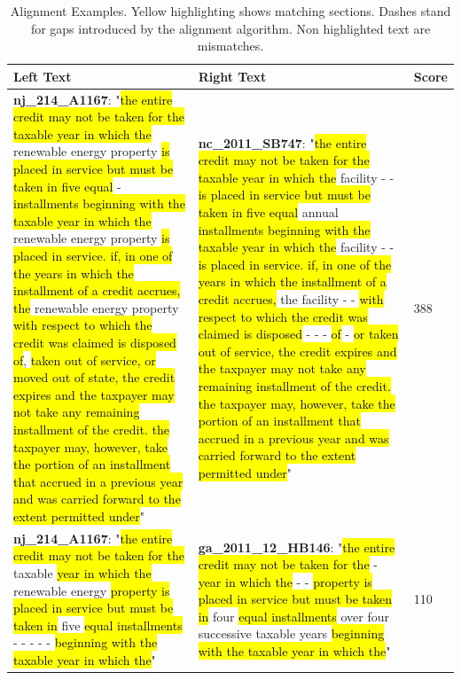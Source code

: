 \documentclass[12pt]{article} %
\begin{document}
\clearpage

\begin{table}[ht!]
\centering
\caption{Alignment Examples. Yellow highlighting shows matching sections. Dashes stand for gaps introduced by the alignment algorithm. Non highlighted text are mismatches.}
\label{tab:alignment_examples}
\bgroup
\def\arraystretch{2}
\begin{tabular}{p{}|p{}|p{}}
Left Text & Right Text & Score\\
\hline

\textbf{nj\_214\_A1167}: "\hl{the entire credit may not be taken for the taxable year in which the} renewable energy property \hl{is placed in service but must be taken in five equal} - \hl{installments beginning with the taxable year in which the} renewable energy property \hl{is placed in service. if, in one of the years in which the installment of a credit accrues, the} renewable energy property \hl{with respect to which the credit was claimed is disposed of}, \hl{taken out of service, or moved out of state, the credit expires and the taxpayer may not take any remaining installment of the credit. the taxpayer may, however, take the portion of an installment that accrued in a previous year and was carried forward to the extent permitted under}" & \textbf{nc\_2011\_SB747}: "\hl{the entire credit may not be taken for the taxable year in which the} facility - - \hl{is placed in service but must be taken in five equal} annual \hl{installments beginning with the taxable year in which the} facility - - \hl{is placed in service. if, in one of the years in which the installment of a credit accrues,} the facility - - \hl{with respect to which the credit was claimed is disposed} - - - \hl{of} - \hl{or taken out of service, the credit expires and the taxpayer may not take any remaining installment of the credit. the taxpayer may, however, take the portion of an installment that accrued in a previous year and was carried forward to the extent permitted under}" & $388$ \\

\textbf{nj\_214\_A1167}: "\hl{the entire credit may not be taken for the} taxable \hl{year in which the} renewable energy \hl{property is placed in service but must be taken in} five \hl{equal installments} - - - - - \hl{beginning with the taxable year in which the}" & \textbf{ga\_2011\_12\_HB146}: "\hl{the entire credit may not be taken for the} - \hl{year in which the} - - \hl{property is placed in service but must be taken in} four \hl{equal installments} over four successive taxable years \hl{beginning with the taxable year in which the}" & 110 \\


\end{tabular}
\end{table}
\end{document}
